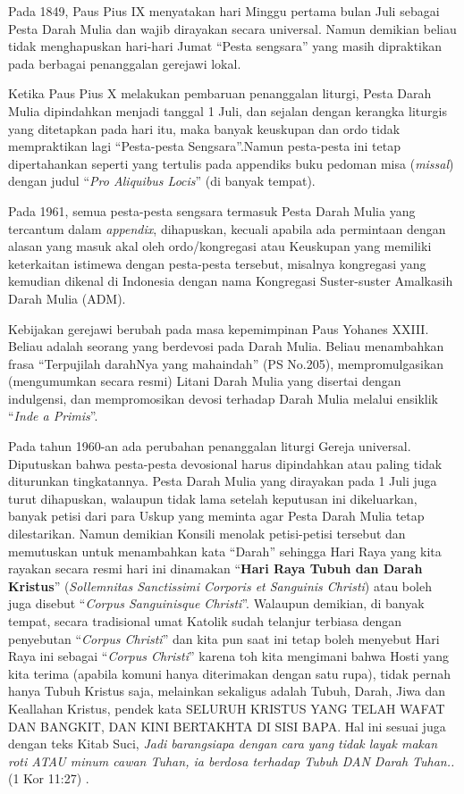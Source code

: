  

Pada 1849, Paus Pius IX menyatakan hari Minggu pertama bulan Juli sebagai Pesta Darah Mulia dan wajib dirayakan secara universal. Namun demikian beliau tidak menghapuskan hari-hari Jumat “Pesta sengsara” yang masih dipraktikan pada berbagai penanggalan gerejawi lokal.

 

Ketika Paus Pius X melakukan pembaruan penanggalan liturgi, Pesta Darah Mulia dipindahkan menjadi tanggal 1 Juli, dan sejalan dengan kerangka liturgis yang ditetapkan pada hari itu, maka banyak keuskupan dan ordo tidak mempraktikan lagi “Pesta-pesta Sengsara”.Namun pesta-pesta ini tetap dipertahankan seperti yang tertulis pada appendiks buku pedoman misa (\textit{missal}) dengan judul “\textit{Pro Aliquibus Locis}” (di banyak tempat).

 

Pada 1961, semua pesta-pesta sengsara termasuk Pesta Darah Mulia yang tercantum dalam \textit{appendix}, dihapuskan, kecuali apabila ada permintaan dengan alasan yang masuk akal oleh ordo/kongregasi atau Keuskupan yang memiliki keterkaitan istimewa dengan pesta-pesta tersebut, misalnya kongregasi yang kemudian dikenal di Indonesia dengan nama Kongregasi Suster-suster Amalkasih Darah Mulia (ADM).

 

Kebijakan gerejawi berubah pada masa kepemimpinan Paus Yohanes XXIII. Beliau adalah seorang yang berdevosi pada Darah Mulia. Beliau menambahkan frasa “Terpujilah darahNya yang mahaindah” (PS No.205), mempromulgasikan (mengumumkan secara resmi) Litani Darah Mulia yang disertai dengan indulgensi, dan mempromosikan devosi terhadap Darah Mulia melalui ensiklik “\textit{Inde a Primis}”.

Pada tahun 1960-an ada perubahan penanggalan liturgi Gereja universal. Diputuskan bahwa pesta-pesta devosional harus dipindahkan atau paling tidak diturunkan tingkatannya. Pesta Darah Mulia yang dirayakan pada 1 Juli juga turut dihapuskan, walaupun tidak lama setelah keputusan ini dikeluarkan, banyak petisi dari para Uskup yang meminta agar Pesta Darah Mulia tetap dilestarikan. Namun demikian Konsili menolak petisi-petisi tersebut dan memutuskan untuk menambahkan kata “Darah” sehingga Hari Raya yang kita rayakan secara resmi hari ini dinamakan “\textbf{Hari Raya Tubuh dan Darah Kristus}” (\textit{Sollemnitas Sanctissimi Corporis et Sanguinis Christi}) atau boleh juga disebut “\textit{Corpus Sanguinisque Christi}”. Walaupun demikian, di banyak tempat, secara tradisional umat Katolik sudah telanjur terbiasa dengan penyebutan “\textit{Corpus Christi}” dan kita pun saat ini tetap boleh menyebut Hari Raya ini sebagai “\textit{Corpus Christi}” karena toh kita mengimani bahwa Hosti yang kita terima (apabila komuni hanya diterimakan dengan satu rupa), tidak pernah hanya Tubuh Kristus saja, melainkan sekaligus adalah Tubuh, Darah, Jiwa dan Keallahan Kristus, pendek kata SELURUH KRISTUS YANG TELAH WAFAT DAN BANGKIT, DAN KINI BERTAKHTA DI SISI BAPA. Hal ini sesuai juga dengan teks Kitab Suci, \textit{Jadi barangsiapa dengan cara yang tidak layak makan roti ATAU minum cawan Tuhan, ia berdosa terhadap Tubuh DAN Darah Tuhan..}(1 Kor 11:27)  .

